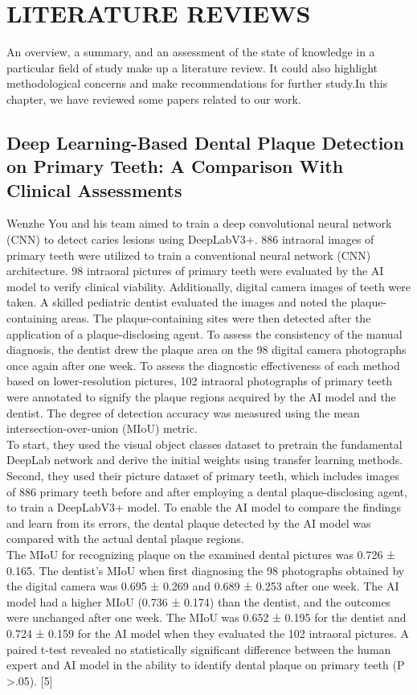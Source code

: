 
\chapter{LITERATURE REVIEWS}

An overview, a summary, and an assessment of the state of knowledge in a particular field of study make up a literature review. It could also highlight methodological concerns and make recommendations for further study.In this chapter, we have reviewed some papers related to our work.


\section{Deep Learning-Based Dental Plaque Detection on Primary Teeth: A Comparison With Clinical Assessments} Wenzhe You and his team aimed to train a deep convolutional neural network (CNN) to detect caries lesions using DeepLabV3+.  886 intraoral images of primary teeth were utilized to train a conventional neural network (CNN) architecture. 98 intraoral pictures of primary teeth were evaluated by the AI model to verify clinical viability. Additionally, digital camera images of teeth were taken. A skilled pediatric dentist evaluated the images and noted the plaque-containing areas. The plaque-containing sites were then detected after the application of a plaque-disclosing agent. To assess the consistency of the manual diagnosis, the dentist drew the plaque area on the 98 digital camera photographs once again after one week. To assess the diagnostic effectiveness of each method based on lower-resolution pictures, 102 intraoral photographs of primary teeth were annotated to signify the plaque regions acquired by the AI model and the dentist. The degree of detection accuracy was measured using the mean intersection-over-union (MIoU) metric.\\
To start, they used the visual object classes dataset to pretrain the fundamental DeepLab network and derive the initial weights using transfer learning methods. Second, they used their picture dataset of primary teeth, which includes images of 886 primary teeth before and after employing a dental plaque-disclosing agent, to train a DeepLabV3+ model. To enable the AI model to compare the findings and learn from its errors, the dental plaque detected by the AI model was compared with the actual dental plaque regions.\\
The MIoU for recognizing plaque on the examined dental pictures was 0.726 ± 0.165. The dentist's MIoU when first diagnosing the 98 photographs obtained by the digital camera was 0.695 ± 0.269 and 0.689 ± 0.253 after one week. The AI model had a higher MIoU (0.736 ± 0.174) than the dentist, and the outcomes were unchanged after one week. The MIoU was 0.652 ± 0.195 for the dentist and 0.724 ± 0.159 for the AI model when they evaluated the 102 intraoral pictures. A paired t-test revealed no statistically significant difference between the human expert and AI model in the ability to identify dental plaque on primary teeth (P >.05). [5]\\

